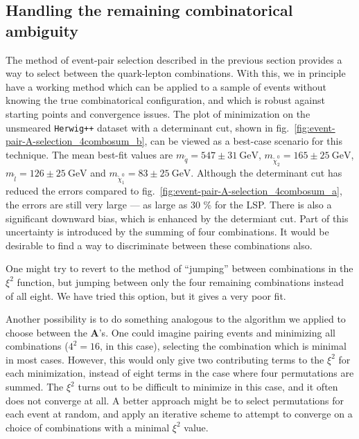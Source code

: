 \documentclass[twoside,english]{uiofysmaster}
\begin{document}
\subsection{Handling the remaining combinatorical ambiguity}
The method of event-pair selection described in the previous section provides a way to select between the quark-lepton combinations. With this, we in principle have a working method which can be applied to a sample of events without knowing the true combinatorical configuration, and which is robust against starting points and convergence issues. The plot of minimization on the unsmeared {\tt Herwig++} dataset with a determinant cut, shown in fig.\ \ref{fig:event-pair-A-selection_4combosum_b}, can be viewed as a best-case scenario for this technique. The mean best-fit values are $m_{\tilde q} = 547 \pm 31 ~\mathrm{GeV}$, $m_{\tilde \chi_2^0} = 165\pm 25 ~\mathrm{GeV}$, $m_{\tilde l} = 126 \pm 25 ~\mathrm{GeV}$ and $m_{\tilde \chi_1^0} = 83 \pm 25 ~\mathrm{GeV}$. Although the determinant cut has reduced the errors compared to fig.\ \ref{fig:event-pair-A-selection_4combosum_a}, the errors are still very large --- as large as 30 \% for the LSP. There is also a significant downward bias, which is enhanced by the determiant cut. Part of this uncertainty is introduced by the summing of four combinations. It would be desirable to find a way to discriminate between these combinations also. 

One might try to revert to the method of ``jumping'' between combinations in the $\xi^2$ function, but jumping between only the four remaining combinations instead of all eight. We have tried this option, but it gives a very poor fit. 

Another possibility is to do something analogous to the algorithm we applied to choose between the $\mathbf{A}$'s. One could imagine pairing events and minimizing all combinations ($4^2 = 16$, in this case), selecting the combination which is minimal in most cases. However, this would only give two contributing terms to the $\xi^2$ for each minimization, instead of eight terms in the case where four permutations are summed. The $\xi^2$ turns out to be difficult to minimize in this case, and it often does not converge at all. A better approach might be to select permutations for each event at random, and apply an iterative scheme to attempt to converge on a choice of combinations with a minimal $\xi^2$ value. 
\end{document}
